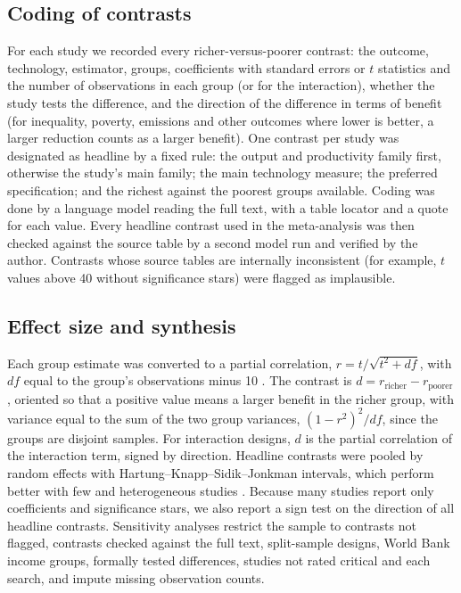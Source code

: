 \documentclass[11pt,a4paper]{article}
\begin{document}
\subsection{Coding of contrasts}
For each study we recorded every richer-versus-poorer contrast: the outcome, technology, estimator, groups, coefficients with standard errors or $t$ statistics and the number of observations in each group (or for the interaction), whether the study tests the difference, and the direction of the difference in terms of benefit (for inequality, poverty, emissions and other outcomes where lower is better, a larger reduction counts as a larger benefit). One contrast per study was designated as headline by a fixed rule: the output and productivity family first, otherwise the study's main family; the main technology measure; the preferred specification; and the richest against the poorest groups available. Coding was done by a language model reading the full text, with a table locator and a quote for each value. Every headline contrast used in the meta-analysis was then checked against the source table by a second model run and verified by the author. Contrasts whose source tables are internally inconsistent (for example, $t$ values above 40 without significance stars) were flagged as implausible.

\subsection{Effect size and synthesis}
Each group estimate was converted to a partial correlation, $r = t/\sqrt{t^2 + df}$, with $df$ equal to the group's observations minus 10 \cite{stanley2012}. The contrast is $d = r_{\mathrm{richer}} - r_{\mathrm{poorer}}$, oriented so that a positive value means a larger benefit in the richer group, with variance equal to the sum of the two group variances, $(1-r^2)^2/df$, since the groups are disjoint samples. For interaction designs, $d$ is the partial correlation of the interaction term, signed by direction. Headline contrasts were pooled by random effects \cite{dersimonian1986} with Hartung--Knapp--Sidik--Jonkman intervals, which perform better with few and heterogeneous studies \cite{hartung2001,inthout2014}. Because many studies report only coefficients and significance stars, we also report a sign test on the direction of all headline contrasts. Sensitivity analyses restrict the sample to contrasts not flagged, contrasts checked against the full text, split-sample designs, World Bank income groups, formally tested differences, studies not rated critical and each search, and impute missing observation counts.
\end{document}
